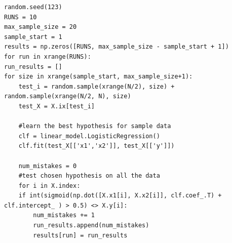 \documentclass{article}
\begin{document}
\begin{lstlisting}[frame=single]  
random.seed(123)
RUNS = 10
max_sample_size = 20
sample_start = 1
results = np.zeros([RUNS, max_sample_size - sample_start + 1])
for run in xrange(RUNS):
run_results = []
for size in xrange(sample_start, max_sample_size+1):
	test_i = random.sample(xrange(N/2), size) + random.sample(xrange(N/2, N), size)
	test_X = X.ix[test_i]
	
	#learn the best hypothesis for sample data
	clf = linear_model.LogisticRegression()
	clf.fit(test_X[['x1','x2']], test_X[['y']])
	
	num_mistakes = 0
	#test chosen hypothesis on all the data
	for i in X.index:
	if int(sigmoid(np.dot([X.x1[i], X.x2[i]], clf.coef_.T) + clf.intercept_ ) > 0.5) <> X.y[i]:	
		num_mistakes += 1
		run_results.append(num_mistakes)
		results[run] = run_results
\end{lstlisting}
\end{document}
